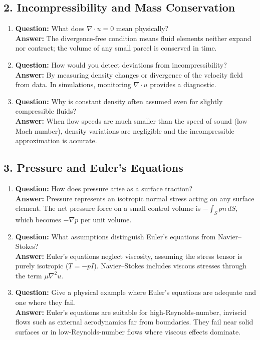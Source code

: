 \documentclass[12pt]{article}
\begin{document}
\subsection*{2. Incompressibility and Mass Conservation}
\begin{enumerate}
\item \textbf{Question:} What does $\nabla \cdot u = 0$ mean physically?\\
\textbf{Answer:} The divergence-free condition means fluid elements neither expand nor contract; the volume of any small parcel is conserved in time.

\item \textbf{Question:} How would you detect deviations from incompressibility?\\
\textbf{Answer:} By measuring density changes or divergence of the velocity field from data. In simulations, monitoring $\nabla \cdot u$ provides a diagnostic.

\item \textbf{Question:} Why is constant density often assumed even for slightly compressible fluids?\\
\textbf{Answer:} When flow speeds are much smaller than the speed of sound (low Mach number), density variations are negligible and the incompressible approximation is accurate.
\end{enumerate}

\subsection*{3. Pressure and Euler’s Equations}
\begin{enumerate}
\item \textbf{Question:} How does pressure arise as a surface traction?\\
\textbf{Answer:} Pressure represents an isotropic normal stress acting on any surface element. The net pressure force on a small control volume is $-\!\int_S p n\,dS$, which becomes $-\nabla p$ per unit volume.

\item \textbf{Question:} What assumptions distinguish Euler’s equations from Navier--Stokes?\\
\textbf{Answer:} Euler’s equations neglect viscosity, assuming the stress tensor is purely isotropic ($T = -pI$). Navier--Stokes includes viscous stresses through the term $\mu \nabla^2 u$.

\item \textbf{Question:} Give a physical example where Euler’s equations are adequate and one where they fail.\\
\textbf{Answer:} Euler’s equations are suitable for high-Reynolds-number, inviscid flows such as external aerodynamics far from boundaries. They fail near solid surfaces or in low-Reynolds-number flows where viscous effects dominate.
\end{enumerate}
\end{document}
